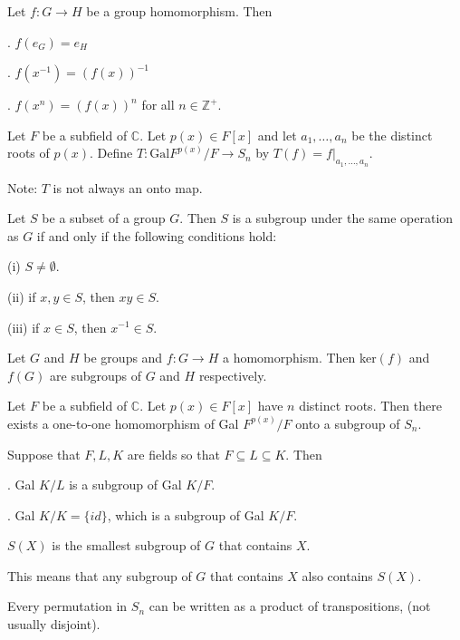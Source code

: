 \documentclass{article}
\newcommand\inv{^{-1}}
\newcommand{\Z}{\mathbb Z}
\newcommand{\C}{\mathbb C}
\begin{document}
Let $f:G \to H$ be a group homomorphism. Then

\indent{}. $f(e_G)=e_H$

\indent{}. $f(x\inv)=(f(x))\inv$

\indent{}. $f(x^n)=(f(x))^n$ for all $n\in\Z^+$.


Let $F$ be a subfield of $\C$. Let $p(x)\in F[x]$ and let $a_1,\hdots,a_n$ be the distinct roots of $p(x)$. Define $T:\text{Gal}F^{p(x)}/F\to S_n$ by $T(f)=f|_{a_1,\hdots,a_n}$.

Note: $T$ is not always an onto map.


Let $S$ be a subset of a group $G$. Then $S$ is a subgroup under the same operation as $G$ if and only if the following conditions hold:

\indent\indent(i) $S\neq \emptyset$.

\indent\indent(ii) if $x,y\in S$, then $xy\in S$.

\indent\indent(iii) if $x\in S$, then $x\inv\in S$.


Let $G$ and $H$ be groups and $f:G \to H$ a homomorphism. Then ker$(f)$ and $f(G)$ are subgroups of $G$ and $H$ respectively.


Let $F$ be a subfield of $\C$. Let $p(x)\in F[x]$ have $n$ distinct roots. Then there exists a one-to-one homomorphism of Gal $F^{p(x)}/F$ onto a subgroup of $S_n$.


Suppose that $F,L,K$ are fields so that $F\subseteq L \subseteq K$. Then

\indent{}. Gal $K/L$ is a subgroup of Gal $K/F$.

\indent{}. Gal $K/K = \{id\}$, which is a subgroup of Gal $K/F$.

\newpage


$S(X)$ is the smallest subgroup of $G$ that contains $X$.

This means that any subgroup of $G$ that contains $X$ also contains $S(X)$.


Every permutation in $S_n$ can be written as a product of transpositions, (not usually disjoint).
\end{document}
